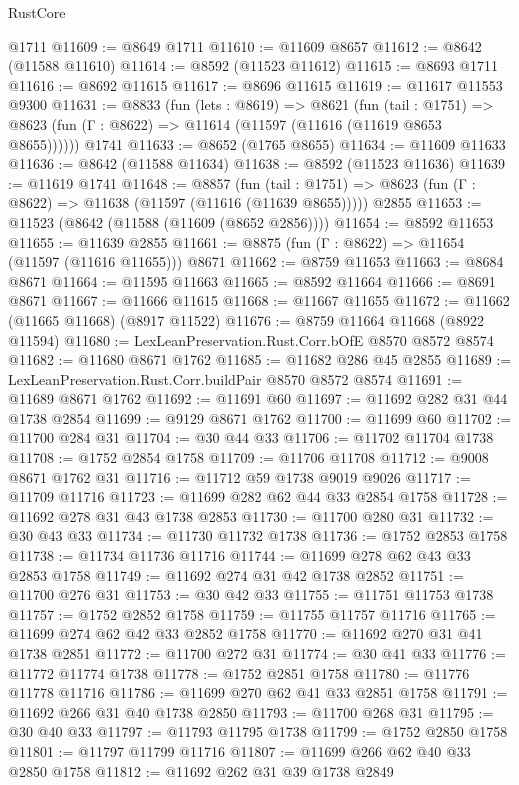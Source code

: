 \begin{lexlean}{RustCore}
\begin{coremodule}
    @1711
@11609 := @8649 @1711
@11610 := @11609 @8657
@11612 := @8642 (@11588 @11610)
@11614 := @8592 (@11523 @11612)
@11615 := @8693 @1711
@11616 := @8692 @11615
@11617 := @8696 @11615
@11619 := @11617 @11553 @9300
@11631 := @8833
    (fun (lets : @8619) =>
    @8621
      (fun (tail : @1751) =>
      @8623 (fun (Γ : @8622) => @11614 (@11597 (@11616 (@11619 @8653 @8655))))))
    @1741
@11633 := @8652 (@1765 @8655)
@11634 := @11609 @11633
@11636 := @8642 (@11588 @11634)
@11638 := @8592 (@11523 @11636)
@11639 := @11619 @1741
@11648 := @8857
    (fun (tail : @1751) => @8623 (fun (Γ : @8622) => @11638 (@11597 (@11616 (@11639 @8655)))))
    @2855
@11653 := @11523 (@8642 (@11588 (@11609 (@8652 @2856))))
@11654 := @8592 @11653
@11655 := @11639 @2855
@11661 := @8875 (fun (Γ : @8622) => @11654 (@11597 (@11616 @11655))) @8671
@11662 := @8759 @11653
@11663 := @8684 @8671
@11664 := @11595 @11663
@11665 := @8592 @11664
@11666 := @8691 @8671
@11667 := @11666 @11615
@11668 := @11667 @11655
@11672 := @11662 (@11665 @11668) (@8917 @11522)
@11676 := @8759 @11664 @11668 (@8922 @11594)
@11680 := LexLeanPreservation.Rust.Corr.bOfE @8570 @8572 @8574
@11682 := @11680 @8671 @1762
@11685 := @11682 @286 @45 @2855
@11689 := LexLeanPreservation.Rust.Corr.buildPair @8570 @8572 @8574
@11691 := @11689 @8671 @1762
@11692 := @11691 @60
@11697 := @11692 @282 @31 @44 @1738 @2854
@11699 := @9129 @8671 @1762
@11700 := @11699 @60
@11702 := @11700 @284 @31
@11704 := @30 @44 @33
@11706 := @11702 @11704 @1738
@11708 := @1752 @2854 @1758
@11709 := @11706 @11708
@11712 := @9008 @8671 @1762 @31
@11716 := @11712 @59 @1738 @9019 @9026
@11717 := @11709 @11716
@11723 := @11699 @282 @62 @44 @33 @2854 @1758
@11728 := @11692 @278 @31 @43 @1738 @2853
@11730 := @11700 @280 @31
@11732 := @30 @43 @33
@11734 := @11730 @11732 @1738
@11736 := @1752 @2853 @1758
@11738 := @11734 @11736 @11716
@11744 := @11699 @278 @62 @43 @33 @2853 @1758
@11749 := @11692 @274 @31 @42 @1738 @2852
@11751 := @11700 @276 @31
@11753 := @30 @42 @33
@11755 := @11751 @11753 @1738
@11757 := @1752 @2852 @1758
@11759 := @11755 @11757 @11716
@11765 := @11699 @274 @62 @42 @33 @2852 @1758
@11770 := @11692 @270 @31 @41 @1738 @2851
@11772 := @11700 @272 @31
@11774 := @30 @41 @33
@11776 := @11772 @11774 @1738
@11778 := @1752 @2851 @1758
@11780 := @11776 @11778 @11716
@11786 := @11699 @270 @62 @41 @33 @2851 @1758
@11791 := @11692 @266 @31 @40 @1738 @2850
@11793 := @11700 @268 @31
@11795 := @30 @40 @33
@11797 := @11793 @11795 @1738
@11799 := @1752 @2850 @1758
@11801 := @11797 @11799 @11716
@11807 := @11699 @266 @62 @40 @33 @2850 @1758
@11812 := @11692 @262 @31 @39 @1738 @2849

\end{coremodule}
\end{lexlean}
